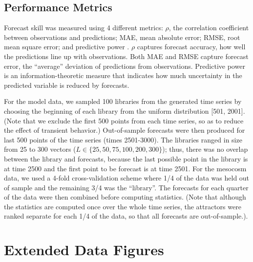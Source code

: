 \subsection{Performance Metrics}

Forecast skill was measured using 4 different metrics: $\rho$, the correlation coefficient between observations and predictions; MAE, mean absolute error; RMSE, root mean square error; and predictive power \cite{Schneider_1999}. $\rho$ captures forecast accuracy, how well the predictions line up with observations. Both MAE and RMSE capture forecast error, the ``average'' deviation of predictions from observations. Predictive power is an information-theoretic measure that indicates how much uncertainty in the predicted variable is reduced by forecasts.

For the model data, we sampled 100 libraries from the generated time series by choosing the beginning of each library from the uniform distribution [501, 2001]. (Note that we exclude the first 500 points from each time series, so as to reduce the effect of transient behavior.) Out-of-sample forecasts were then produced for last 500 points of the time series (times 2501-3000). The libraries ranged in size from 25 to 300 vectors ($L \in \{25, 50, 75, 100, 200, 300\}$); thus, there was no overlap between the library and forecasts, because the last possible point in the library is at time 2500 and the first point to be forecast is at time 2501. For the mesocosm data, we used a 4-fold cross-validation scheme where 1/4 of the data was held out of sample and the remaining 3/4 was the ``library''. The forecasts for each quarter of the data were then combined before computing statistics. (Note that although the statistics are computed once over the whole time series, the attractors were ranked separate for each 1/4 of the data, so that all forecasts are out-of-sample.).

\section{Extended Data Figures}

